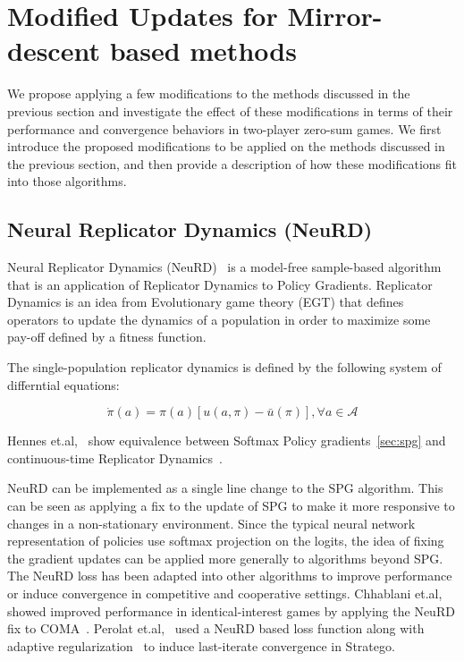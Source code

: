\chapter{Modified Updates for Mirror-descent based methods}

We propose applying a few modifications to the methods discussed in the previous section and
investigate the effect of these modifications in terms of their performance and convergence
behaviors in two-player zero-sum games.
We first introduce the proposed modifications to be applied on the methods discussed in the
previous section, and then provide a description of how these modifications fit into those
algorithms.

\section{Neural Replicator Dynamics (NeuRD)}
Neural Replicator Dynamics (NeuRD)~\cite{hennesNeural2020} is a model-free sample-based algorithm
that is an application of Replicator Dynamics to Policy Gradients.
Replicator Dynamics is an idea from Evolutionary game theory (EGT) that defines operators to update
the dynamics of a population in order to maximize some pay-off defined by a fitness function.

The single-population replicator dynamics is defined by the following system of differntial
equations:

\begin{equation}
	\label{eqn:rd} \dot{\pi}(a) = \pi(a)[u(a, \pi) -
		\bar{u}(\pi)], \forall a \in \mathcal{A}
\end{equation}

Hennes
et.al,~\cite{hennesNeural2020} show equivalence between Softmax Policy gradients~\ref{sec:spg} and
continuous-time Replicator Dynamics~\cite[THEOREM 1, on p5]{hennesNeural2020}\label{thm:spgrd}.

NeuRD can be implemented as a single line change to the SPG algorithm.
This can be seen as applying a fix to the update of SPG to make it more responsive to changes in a
non-stationary environment.
Since the typical neural network representation of policies use softmax projection on the logits,
the idea of fixing the gradient updates can be applied more generally to algorithms beyond SPG.
The NeuRD loss has been adapted into other algorithms to improve performance or induce convergence
in competitive and cooperative settings.
Chhablani et.al,~\cite{chhablaniCounterfactual2021} showed improved performance in
identical-interest games by applying the NeuRD fix to COMA~\cite{foersterCounterfactual2018}.
Perolat et.al,~\cite{perolatMastering2022} used a NeuRD based loss function along with adaptive
regularization~\cite{perolatPoincare2021} to induce last-iterate convergence in Stratego.

